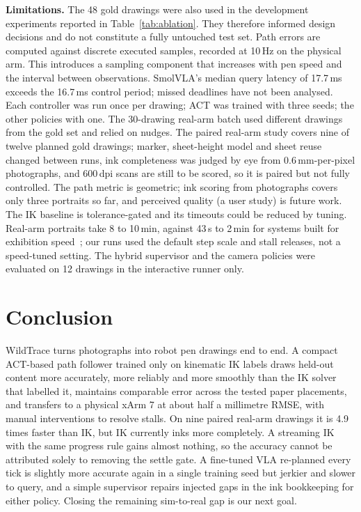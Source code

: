 \documentclass[conference]{IEEEtran}
\newcommand{\mm}{\,mm\xspace}
\begin{document}
\textbf{Limitations.} The 48 gold drawings were also used in the development experiments reported in
Table~\ref{tab:ablation}. They therefore informed design decisions and do not constitute a fully untouched test
set. Path errors are computed against discrete executed samples, recorded at 10\,Hz on the physical arm. This
introduces a sampling component that increases with pen speed and the interval between observations. SmolVLA's
median query latency of 17.7\,ms exceeds the 16.7\,ms control period; missed deadlines have not been analysed.
Each controller was run once per drawing; ACT was trained with three seeds; the other policies with one. The 30-drawing real-arm batch used different drawings
from the gold set and relied on nudges. The paired real-arm study covers nine of twelve planned gold drawings;
marker, sheet-height model and sheet reuse changed between runs, ink completeness was judged by eye from
0.6\mm-per-pixel photographs, and 600\,dpi scans are still to be scored, so it is paired but not fully controlled. The path metric is
geometric; ink scoring from photographs covers only three portraits so far, and perceived quality (a user study)
is future work. The IK baseline is
tolerance-gated and its timeouts could be reduced by tuning. Real-arm portraits take 8 to 10\,min, against
43\,s to 2\,min for systems built for exhibition speed~\cite{wang2019robocodraw,gao2020aisketcher,nasrat2023artistic};
our runs used the default step scale and stall releases, not a speed-tuned setting. The hybrid supervisor and
the camera policies were evaluated on 12 drawings in the interactive runner only.

\section{Conclusion}

WildTrace turns photographs into robot pen drawings end to end. A compact ACT-based path follower trained only on
kinematic IK labels draws held-out content more accurately, more reliably and more smoothly than the IK
solver that labelled it, maintains comparable error across the tested paper placements, and transfers to a physical xArm 7 at about half
a millimetre RMSE, with manual interventions to resolve stalls. On nine paired real-arm drawings it is 4.9 times
faster than IK, but IK currently inks more completely. A streaming IK with the same progress rule gains almost
nothing, so the accuracy cannot be attributed solely to removing the settle gate. A fine-tuned VLA re-planned
every tick is slightly more accurate again in a single training seed but jerkier and slower to query, and a
simple supervisor repairs injected gaps in the ink bookkeeping for either policy. Closing the remaining sim-to-real gap is our next goal.



\end{document}
